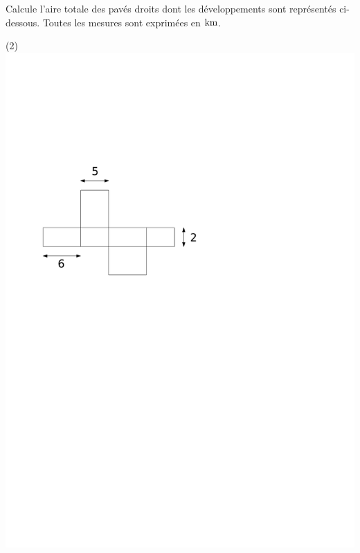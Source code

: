 \documentclass[a4paper,11pt]{report}
\begin{document}
\begin{exo}{
Calcule l'aire totale des pavés droits dont les développements sont représentés ci-dessous. Toutes les mesures sont exprimées en $\tunit{}{\kilo m}$.
\begin{tasks}(2)
    \task ~\\ \includegraphics[scale=0.5]{media/gm-02/pave1-2.pdf}

\end{tasks}}
\end{exo}
\end{document}
